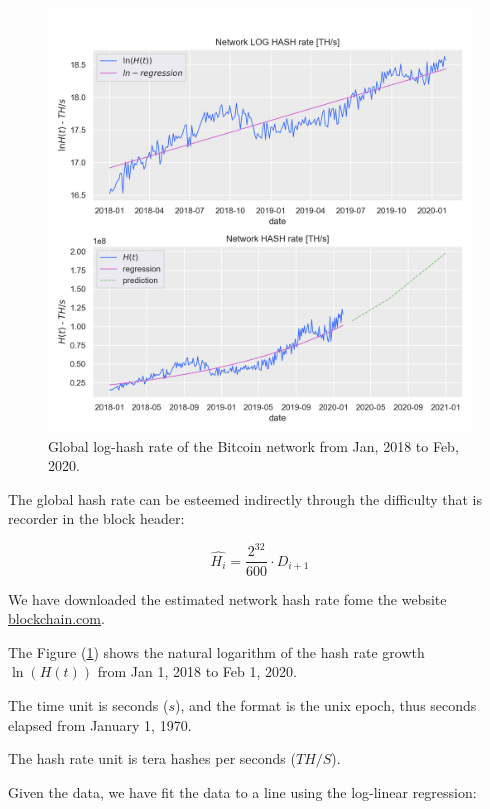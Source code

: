 \documentclass{book}
\theoremstyle{definition}
\begin{document}
\begin{figure}[!htb]
    \centering
    \includegraphics[width=1.0\textwidth]{img/bitcoin-hash-rate.png}
    \caption{Global log-hash rate of the Bitcoin network from Jan, 2018 to Feb, 2020.}
    \label{fig:hash_power}
\end{figure}

The global hash rate can be esteemed indirectly through the difficulty that is recorder in the block header:

\begin{equation}
    \widehat{H_{i}} = \frac{2^{32}}{600} \cdot D_{i+1} \label{H_estimate}
\end{equation}

We have downloaded the estimated network hash rate fome the website \href{https://www.blockchain.com/}{blockchain.com}.

The Figure (\ref{fig:hash_power}) shows the natural logarithm of the hash rate growth $\ln(H(t))$ from Jan 1, 2018 to Feb 1, 2020.

The time unit is seconds ($s$), and the format is the unix epoch, thus seconds elapsed from January 1, 1970.

The hash rate unit is tera hashes per seconds ($TH/S$).

Given the data, we have fit the data to a line using the log-linear regression:
\end{document}
